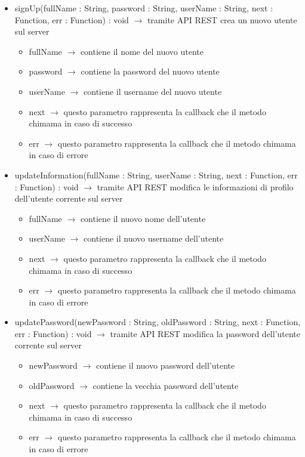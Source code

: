 \begin{description}
\begin{itemize}
	\item signUp(fullName : String, password : String, userName : String, next : Function, err : Function) : void $\rightarrow$ tramite API REST crea un nuovo utente sul server\begin{itemize}
		\item fullName $\rightarrow$ contiene il nome del nuovo utente
		\item password $\rightarrow$ contiene la password del nuovo utente
		\item userName $\rightarrow$ contiene il username del nuovo utente
		\item next $\rightarrow$ questo parametro rappresenta la callback che il metodo chimama in caso di successo
		\item err $\rightarrow$ questo parametro rappresenta la callback che il metodo chimama in caso di errore
	\end{itemize}
	
	\item updateInformation(fullName : String, userName : String, next : Function, err : Function) : void $\rightarrow$ tramite API REST modifica le informazioni di profilo dell'utente corrente sul server\begin{itemize}
		\item fullName $\rightarrow$ contiene il nuovo nome dell'utente
		\item userName $\rightarrow$ contiene il nuovo username dell'utente
		\item next $\rightarrow$ questo parametro rappresenta la callback che il metodo chimama in caso di successo
		\item err $\rightarrow$ questo parametro rappresenta la callback che il metodo chimama in caso di errore
	\end{itemize}
	
	\item updatePassword(newPassword : String, oldPassword : String, next : Function, err : Function) : void $\rightarrow$ tramite API REST modifica la password dell'utente corrente sul server\begin{itemize}
		\item newPassword $\rightarrow$ contiene il nuovo password dell'utente
		\item oldPassword $\rightarrow$ contiene la vecchia password dell'utente
		\item next $\rightarrow$ questo parametro rappresenta la callback che il metodo chimama in caso di successo
		\item err $\rightarrow$ questo parametro rappresenta la callback che il metodo chimama in caso di errore
	\end{itemize}
	

\end{itemize}
\end{description}
